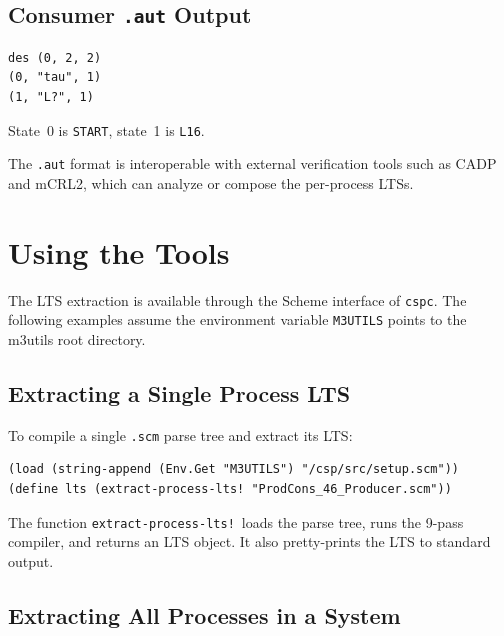 \documentclass[11pt]{article}
\begin{document}
\subsection{Consumer \texttt{.aut} Output}

\begin{Verbatim}[samepage=true,xleftmargin=2em]
des (0, 2, 2)
(0, "tau", 1)
(1, "L?", 1)
\end{Verbatim}

State~0 is \texttt{START}, state~1 is \texttt{L16}.

The \texttt{.aut} format is interoperable with external verification
tools such as CADP and mCRL2, which can analyze or compose the
per-process LTSs.

\section{Using the Tools}

The LTS extraction is available through the Scheme interface of
\texttt{cspc}.  The following examples assume the environment variable
\texttt{M3UTILS} points to the m3utils root directory.

\subsection{Extracting a Single Process LTS}

To compile a single \texttt{.scm} parse tree and extract its LTS:

\begin{lstlisting}
(load (string-append (Env.Get "M3UTILS") "/csp/src/setup.scm"))
(define lts (extract-process-lts! "ProdCons_46_Producer.scm"))
\end{lstlisting}

The function \texttt{extract-process-lts!}\ loads the parse tree,
runs the 9-pass compiler, and returns an LTS object.  It also
pretty-prints the LTS to standard output.

\subsection{Extracting All Processes in a System}
\end{document}
